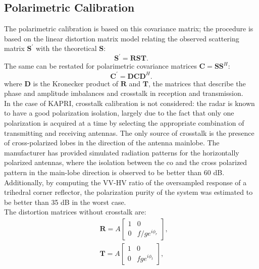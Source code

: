\subsection{Polarimetric Calibration}\label{sec:methods:proc_polcal}
The polarimetric calibration is based on this covariance matrix;
the procedure is based on the linear distortion matrix model\cite{Saraband1990, Sarabandi1992a} relating the observed scattering matrix $\mathbf{S}^\prime$ with the theoretical $\mathbf{S}$:
\begin{equation}\label{eq:distorsion_scattering}
	\mathbf{S}^\prime = \mathbf{R} \mathbf{S} \mathbf{T}.
\end{equation}
The same can be restated for polarimetric covariance matrices $\mathbf{C} = \mathbf{S}\mathbf{S}^H$:
\begin{equation}\label{eq:covariance_distortion}
	\mathbf{C}^\prime = \mathbf{D} \mathbf{C} \mathbf{D}^{H}.
\end{equation}
where $\mathbf{D}$ is the Kronecker product of $\mathbf{R}$ and $\mathbf{T}$, the matrices that describe the phase and amplitude imbalances and crosstalk in reception and transmission.\\
In the case of KAPRI, crosstalk calibration is not considered: the radar is known to have a good polarization isolation, largely due to the fact that only one polarization is acquired at a time by selecting the appropriate combination of transmitting and receiving antennas. The only source of crosstalk is the presence of cross-polarized lobes in the direction of the antenna mainlobe. The manufacturer has provided simulated radiation patterns for the horizontally polarized antennas, where the isolation between the co and the cross polarized pattern in the main-lobe direction is observed to be better than 60 dB. Additionally, by computing the VV-HV ratio of the oversampled response of a trihedral corner reflector, the polarization purity of the system was estimated to be better than 35 dB in the worst case.\\
The distortion matrices without crosstalk are:
\begin{equation}
	\begin{aligned}
	&\mathbf{R} = A \begin{bmatrix}
		1 & 0\\
		0 & f/g e^{i\phi_{r}}
	\end{bmatrix},\\
	&\mathbf{T} = A \begin{bmatrix}
			1 & 0\\
			0 & f g e^{i\phi_{t}}
		\end{bmatrix},
	\end{aligned}
\end{equation}

